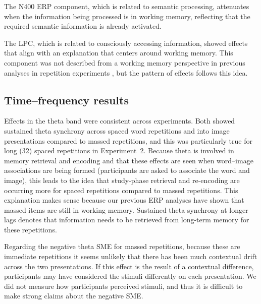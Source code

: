 
The N400 ERP component, which is related to semantic processing, attenuates when the information being processed is in working memory, reflecting that the required semantic information is already activated.


The LPC, which is related to consciously accessing information, showed effects that align with an explanation that centers around working memory.  This component was not described from a working memory perspective in previous analyses in repetition experiments \cite[rather, they discussed it as ``template matching'']{OlicEtal2000,VanSEtal2007}, but the pattern of effects follows this idea.


\subsection{Time--frequency results}

Effects in the theta band were consistent across experiments.  Both showed sustained theta synchrony across spaced word repetitions and into image presentations compared to massed repetitions, and this was particularly true for long (32) spaced repetitions in Experiment~2.  Because theta is involved in memory retrieval and encoding and that these effects are seen when word--image associations are being formed (participants are asked to associate the word and image), this leads to the idea that study-phase retrieval and re-encoding are occurring more for spaced repetitions compared to massed repetitions.  This explanation makes sense because our previous ERP analyses have shown that massed items are still in working memory.  Sustained theta synchrony at longer lags denotes that information needs to be retrieved from long-term memory for these repetitions.

Regarding the negative theta SME for massed repetitions, because these are immediate repetitions it seems unlikely that there has been much contextual drift across the two presentations.  If this effect is the result of a contextual difference, participants may have considered the stimuli differently on each presentation.  We did not measure how participants perceived stimuli, and thus it is difficult to make strong claims about the negative SME.

